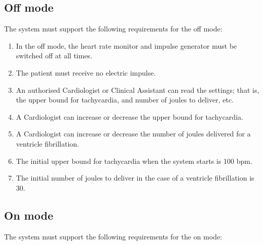\documentclass[11pt]{article}
\begin{document}
\subsection{Off mode}
\label{sec:spec:off-mode}

The system must support the following requirements for the off mode:

\begin{enumerate}[~~\bf{R2}.1]

  \item In the off mode, the heart rate monitor and impulse generator must be switched off at all times.

 \item The patient must receive no electric impulse.

 \item An authorised Cardiologist or Clinical Assistant can read the settings; that is, the upper bound for tachycardia, and number of joules to deliver, etc.



 \item A Cardiologist can increase or decrease the upper bound for tachycardia.

 \item A Cardiologist can increase or decrease the number of joules delivered for a ventricle fibrillation.


 \item The initial upper bound for tachycardia when the system starts is 100 bpm.

 \item The initial number of joules to deliver in the case of a ventricle fibrillation is 30.

\end{enumerate}


\subsection{On mode}
\label{sec:spec:on-mode}

The system must support the following requirements for the on mode:
\end{document}
